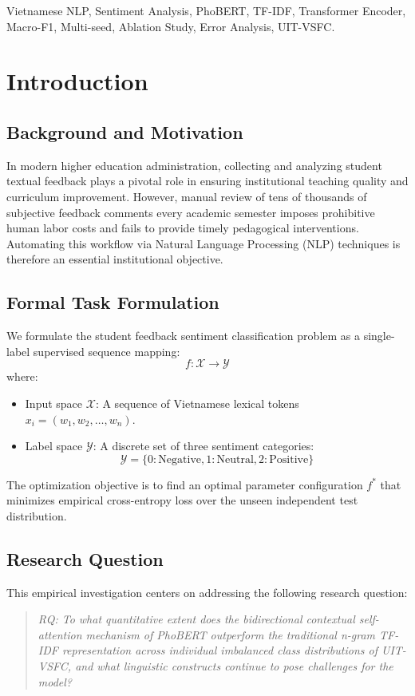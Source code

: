 \documentclass[conference]{IEEEtran}
\begin{document}
\begin{IEEEkeywords}
Vietnamese NLP, Sentiment Analysis, PhoBERT, TF-IDF, Transformer Encoder, Macro-F1, Multi-seed, Ablation Study, Error Analysis, UIT-VSFC.
\end{IEEEkeywords}

\section{Introduction}
\subsection{Background and Motivation}
In modern higher education administration, collecting and analyzing student textual feedback plays a pivotal role in ensuring institutional teaching quality and curriculum improvement. However, manual review of tens of thousands of subjective feedback comments every academic semester imposes prohibitive human labor costs and fails to provide timely pedagogical interventions. Automating this workflow via Natural Language Processing (NLP) techniques is therefore an essential institutional objective.

\subsection{Formal Task Formulation}
We formulate the student feedback sentiment classification problem as a single-label supervised sequence mapping:
\begin{equation}
f: \mathcal{X} \to \mathcal{Y}
\end{equation}
where:
\begin{itemize}
    \item Input space $\mathcal{X}$: A sequence of Vietnamese lexical tokens $x_i = (w_1, w_2, \dots, w_n)$.
    \item Label space $\mathcal{Y}$: A discrete set of three sentiment categories:
    \begin{equation}
    \mathcal{Y} = \{0: \text{Negative}, 1: \text{Neutral}, 2: \text{Positive}\}
    \end{equation}
\end{itemize}
The optimization objective is to find an optimal parameter configuration $f^*$ that minimizes empirical cross-entropy loss over the unseen independent test distribution.

\subsection{Research Question}
This empirical investigation centers on addressing the following research question:
\begin{quote}
\textit{RQ: To what quantitative extent does the bidirectional contextual self-attention mechanism of PhoBERT outperform the traditional n-gram TF-IDF representation across individual imbalanced class distributions of UIT-VSFC, and what linguistic constructs continue to pose challenges for the model?}
\end{quote}
\end{document}
